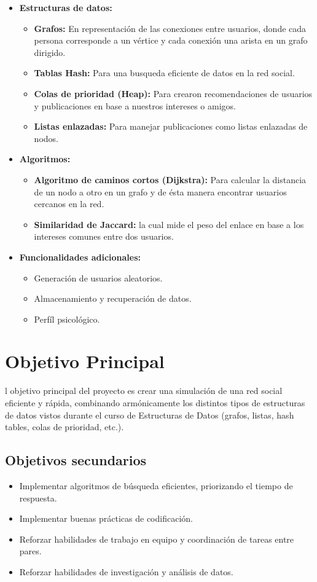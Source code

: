 \documentclass[9pt,letterpaper,onecolumn]{rho-class/rho}
\begin{document}
\begin{itemize}

\item \textbf{Estructuras de datos:}
\begin{itemize}
\item \textbf{Grafos:} En representación de las conexiones entre usuarios, donde cada persona corresponde a un vértice y cada conexión una arista en un grafo dirigido.
\item \textbf{Tablas Hash:} Para una busqueda eficiente de datos en la red social.
\item \textbf{Colas de prioridad (Heap):} Para crearon recomendaciones de usuarios y publicaciones en base a nuestros intereses o amigos.
\item \textbf{Listas enlazadas:} Para manejar publicaciones como listas enlazadas de nodos.
\end{itemize}
\item \textbf{Algoritmos:}
\begin{itemize}
\item \textbf{Algoritmo de caminos cortos (Dijkstra):} Para calcular la distancia de un nodo a otro en un grafo y de ésta manera encontrar usuarios cercanos en la red.
\item \textbf{Similaridad de Jaccard:} la cual mide el peso del enlace en base a los intereses comunes entre dos usuarios.
\end{itemize}
\item \textbf{Funcionalidades adicionales:}
\begin{itemize}
\item Generación de usuarios aleatorios.
\item Almacenamiento y recuperación de datos.
\item Perfíl psicológico.
\end{itemize}
\end{itemize}

\section{Objetivo Principal}

    l objetivo principal del proyecto es crear una simulación de una red social eficiente y rápida, combinando armónicamente los distintos tipos de estructuras de datos vistos durante el curso de Estructuras de Datos (grafos, listas, hash tables, colas de prioridad, etc.).

    \subsection{Objetivos secundarios}
    \begin{itemize}
        \item Implementar algoritmos de búsqueda eficientes, priorizando el tiempo de respuesta.
        \item Implementar buenas prácticas de codificación.
        \item Reforzar habilidades de trabajo en equipo y coordinación de tareas entre pares.
        \item Reforzar habilidades de investigación y análisis de datos.
    \end{itemize}
\end{document}
